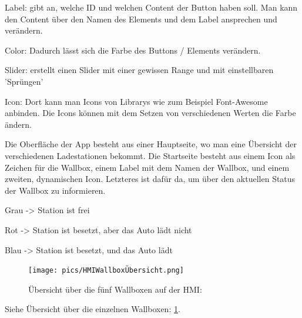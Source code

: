 \begin{compactitem}

  \item Label: gibt an, welche ID und welchen Content der Button haben soll. Man kann den Content über den Namen des Elements und dem Label ansprechen und verändern.
  \item Color: Dadurch lässt sich die Farbe des Buttons / Elements verändern.
  \item Slider: erstellt einen Slider mit einer gewissen Range und mit einstellbaren 'Sprüngen'
  \item Icon: Dort kann man Icons von Librarys wie zum Beispiel Font-Awesome anbinden. Die Icons können mit dem Setzen von verschiedenen Werten die Farbe ändern.
\end{compactitem}
Die Oberfläche der App besteht aus einer Hauptseite, wo man eine Übersicht der verschiedenen Ladestationen bekommt. Die Startseite besteht aus einem Icon als Zeichen für die Wallbox, einem Label mit dem Namen der Wallbox, und einem zweiten, dynamischen Icon. Letzteres ist dafür da, um über den aktuellen Status der Wallbox zu informieren.

\begin{compactitem}
  \item Grau -> Station ist frei
  \item Rot -> Station ist besetzt, aber das Auto lädt nicht
  \item Blau -> Station ist besetzt, und das Auto lädt
\end{compactitem}


\begin{figure}[h t]
  \centering
  \texttt{[image: pics/HMIWallboxÜbersicht.png]}
  \caption{Übersicht über die fünf Wallboxen auf der HMI: }
  \label{fig:impl:HMIWallboxÜbersicht}
\end{figure}

Siehe Übersicht über die einzelnen Wallboxen: \ref{fig:impl:HMIWallboxÜbersicht}.




